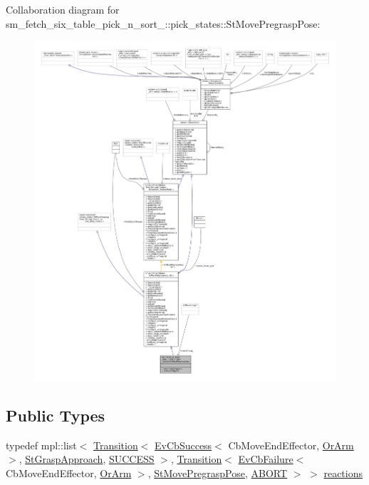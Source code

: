 Collaboration diagram for sm\+\_\+fetch\+\_\+six\+\_\+table\+\_\+pick\+\_\+n\+\_\+sort\+\_\+:\+:pick\+\_\+states\+:\+:St\+Move\+Pregrasp\+Pose\+:
\nopagebreak
\begin{figure}[H]
\begin{center}
\leavevmode
\includegraphics[width=350pt]{structsm__fetch__six__table__pick__n__sort__1_1_1pick__states_1_1StMovePregraspPose__coll__graph}
\end{center}
\end{figure}
\subsection*{Public Types}
\begin{DoxyCompactItemize}
\item 
typedef mpl\+::list$<$ \hyperlink{classsmacc_1_1Transition}{Transition}$<$ \hyperlink{structsmacc_1_1EvCbSuccess}{Ev\+Cb\+Success}$<$ Cb\+Move\+End\+Effector, \hyperlink{classsm__fetch__six__table__pick__n__sort__1_1_1OrArm}{Or\+Arm} $>$, \hyperlink{structsm__fetch__six__table__pick__n__sort__1_1_1pick__states_1_1StGraspApproach}{St\+Grasp\+Approach}, \hyperlink{structsmacc_1_1default__transition__tags_1_1SUCCESS}{S\+U\+C\+C\+E\+SS} $>$, \hyperlink{classsmacc_1_1Transition}{Transition}$<$ \hyperlink{structsmacc_1_1EvCbFailure}{Ev\+Cb\+Failure}$<$ Cb\+Move\+End\+Effector, \hyperlink{classsm__fetch__six__table__pick__n__sort__1_1_1OrArm}{Or\+Arm} $>$, \hyperlink{structsm__fetch__six__table__pick__n__sort__1_1_1pick__states_1_1StMovePregraspPose}{St\+Move\+Pregrasp\+Pose}, \hyperlink{structsmacc_1_1default__transition__tags_1_1ABORT}{A\+B\+O\+RT} $>$ $>$ \hyperlink{structsm__fetch__six__table__pick__n__sort__1_1_1pick__states_1_1StMovePregraspPose_ad905dc0bb7161116b0dd39b6303024af}{reactions}
\end{DoxyCompactItemize}
